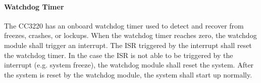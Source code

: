 \paragraph{Watchdog Timer} The CC3220 has an onboard watchdog timer used to detect and recover from freezes, crashes, or lockups. When the watchdog timer reaches zero, the watchdog module shall trigger an interrupt. The ISR triggered by the interrupt shall reset the watchdog timer. In the case the ISR is not able to be triggered by the interrupt (e.g. system freeze), the watchdog module shall reset the system. After the system is reset by the watchdog module, the system shall start up normally.